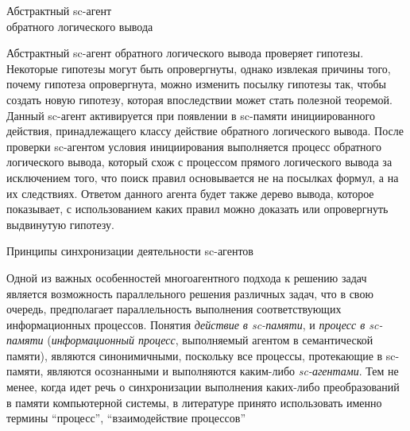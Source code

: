 
\begin{frame}{Абстрактный sc-агент\\ обратного логического вывода}
\topline
\justifying
\vspace{10mm}

  Абстрактный sc-агент обратного логического вывода проверяет гипотезы. Некоторые гипотезы могут быть опровергнуты, однако извлекая причины того, почему гипотеза опровергнута, можно изменить посылку гипотезы так, чтобы создать новую гипотезу, которая впоследствии может стать полезной теоремой. Данный sc-агент активируется при появлении в sc-памяти инициированного действия, принадлежащего классу действие обратного логического вывода. После проверки sc-агентом условия инициирования выполняется процесс обратного логического вывода, который схож с процессом прямого логического вывода за исключением того, что поиск правил основывается не на посылках формул, а на их следствиях. Ответом данного агента будет также дерево вывода, которое показывает, с использованием каких правил можно доказать или опровергнуть выдвинутую гипотезу. 
\end{frame}

\begin{frame}{Принципы синхронизации деятельности sc-агентов}
\topline
\justifying
\vspace{10mm}
 
    Одной из важных особенностей многоагентного подхода к решению задач является возможность параллельного решения различных задач, что в свою очередь, предполагает параллельность выполнения соответствующих информационных процессов.
    Понятия \textit{действие в sc-памяти}, и \textit{процесс в sc-памяти} (\textit{информационный процесс}, выполняемый агентом в семантической памяти), являются синонимичными, поскольку все процессы, протекающие в sc-памяти, являются осознанными и выполняются каким-либо \textit{sc-агентами}. Тем не менее, когда идет речь о синхронизации выполнения каких-либо преобразований в памяти компьютерной системы, в литературе принято использовать именно термины ``процесс'', ``взаимодействие процессов''
\end{frame}

